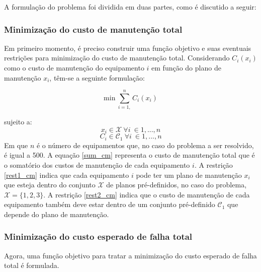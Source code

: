 A formulação do problema foi dividida em duas partes, como é discutido a seguir:

\subsubsection{Minimização do custo de manutenção total} Em primeiro
momento, é preciso construir uma função objetivo e suas eventuais restrições para minimização do custo de manutenção total. Considerando $C_i(x_i)$ como o custo de manutenção do equipamento $i$ em função do plano de manutenção $x_i$, têm-se a seguinte formulação:

\begin{equation}
\mathrm{min}\ \sum_{i=1,}^{n} C_i (x_i) 
\label{sum_cm}
\end{equation}

sujeito a:
\begin{equation}
x_i \in \mathcal{X}\ \forall i\ \in 1, ..., n
\label{rest1_cm}
\end{equation}
\begin{equation}
C_i \in \mathcal{C}_{1}\ \forall i\ \in 1, ..., n
\label{rest2_cm}
\end{equation}
Em que $n$ é o número de equipamentos que, no caso do problema a ser resolvido, é igual a 500. A equação \ref{sum_cm} representa o custo de manutenção total que é o somatório dos custos de manutenção de cada equipamento $i$. A restrição \ref{rest1_cm} indica que cada equipamento $i$ pode ter um plano de manutenção $x_i$ que esteja dentro do conjunto $\mathcal{X}$ de planos pré-definidos, no caso do problema, $\mathcal{X} = \{1,2,3\}$. A restrição \ref{rest2_cm} indica que o custo de manutenção de cada equipamento também deve estar dentro de um conjunto pré-definido $\mathcal{C}_{1}$ que depende do plano de manutenção.

\subsubsection{Minimização do custo esperado de falha total} Agora, uma função objetivo para tratar a minimização do custo esperado de falha total é formulada.
